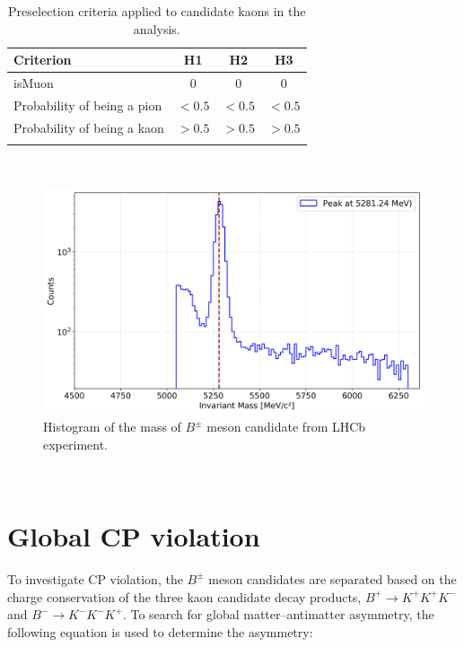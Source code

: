     \begin{table}
    \centering
    \caption{Preselection criteria applied to candidate kaons in the analysis.}
    \label{tab:preselection_criteria}
    \begin{tabular}{lccc}
    \hline
    \textbf{Criterion} & \textbf{H1} & \textbf{H2} & 
    \textbf{H3} \\
    \hline
    isMuon & $0$ & $0$ & $0$
    \\[6pt]
    Probability of being a pion & $< 0.5$ & $< 0.5$ & $< 0.5$ \\[6pt]
    Probability of being a kaon & $> 0.5$ & $> 0.5$ & $> 0.5$ \\
    \hline
    \label{table1}
    \end{tabular}
    \end{table}  
    \\
    


 
    \begin{figure}[H]
        \centering
        \includegraphics[scale=0.1]{Figure/hist_data_mass.png}
        \caption{Histogram of the mass of \(B^\pm\) meson candidate from LHCb experiment.}
        \label{hist_data_mass}
    \end{figure}
    \\

    \section{Global CP violation}
    \label{sec:global_asymmetry}
    To investigate CP violation, the \(B^\pm\) meson candidates are separated based on the charge conservation of the three kaon candidate decay products, \(B^+ \to K^+ K^+ K^-\) and \(B^- \to K^- K^- K^+\). To search for global matter–antimatter asymmetry, the following equation is used to determine the asymmetry:
    

